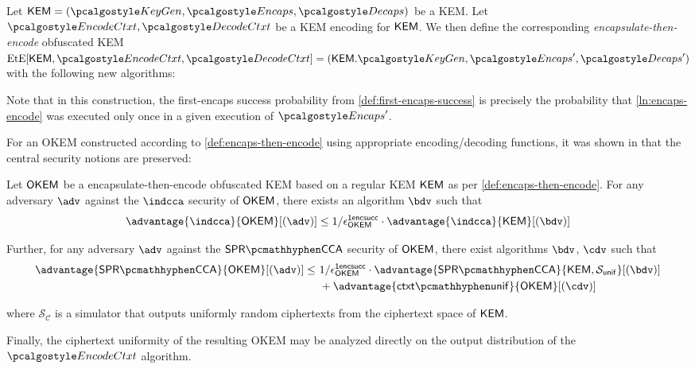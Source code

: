 \begin{definition}
\label{def:encaps-then-encode}
    Let $\KEM = (\kgen, \encaps, \decaps)$ be a KEM.
    Let $\encodectxt, \decodectxt$ be a KEM encoding for $\mathsf{KEM}$.
    We then define the corresponding \emph{encapsulate-then-encode} obfuscated KEM $\ete[\KEM, \encodectxt, \decodectxt] = (\KEM.\kgen, \encaps', \decaps')$ with the following new algorithms:

    
\end{definition}

Note that in this construction, the first-encaps success probability from \cref{def:first-encaps-success} is precisely the probability that \cref{ln:encaps-encode} was executed only once in a given execution of $\encaps'$.

For an OKEM constructed according to \cref{def:encaps-then-encode} using appropriate encoding/decoding functions, it was shown in \cite[Theorems 2.12 and 2.13]{CCS:GunSteVei24} that the central security notions are preserved:

\begin{theorem}
\label{thm:encaps-then-encode-security}
    Let $\mathsf{OKEM}$ be a encapsulate-then-encode obfuscated KEM based on a regular KEM $\mathsf{KEM}$ as per \cref{def:encaps-then-encode}.
    For any adversary $\adv$ against the $\indcca$ security of $\mathsf{OKEM}$, there exists an algorithm $\bdv$ such that
    \[
        \advantage{\indcca}{\OKEM}[(\adv)]
        \leq
        1/\epsilon^\firstencapssuccess_\OKEM
        \cdot \advantage{\indcca}{\KEM}[(\bdv)]
    \]

    Further, for any adversary $\adv$ against the $\sprcca$ security of $\mathsf{OKEM}$, there exist algorithms $\bdv$, $\cdv$ such that
    \begin{align*}
        \advantage{\sprcca}{\OKEM}[(\adv)]
        \leq\ 
        & 1/\epsilon^\firstencapssuccess_\OKEM
        \cdot \advantage{\sprcca}{\KEM, \mathcal S_\mathsf{unif}}[(\bdv)] \\
        &+ \advantage{\ctxtunif}{\OKEM}[(\cdv)]
    \end{align*}
    
    where $\mathcal S_\mathcal{C}$ is a simulator that outputs uniformly random ciphertexts from the ciphertext space of $\mathsf{KEM}$.
\end{theorem}

Finally, the ciphertext uniformity of the resulting OKEM may be analyzed directly on the output distribution of the $\encodectxt$ algorithm.

